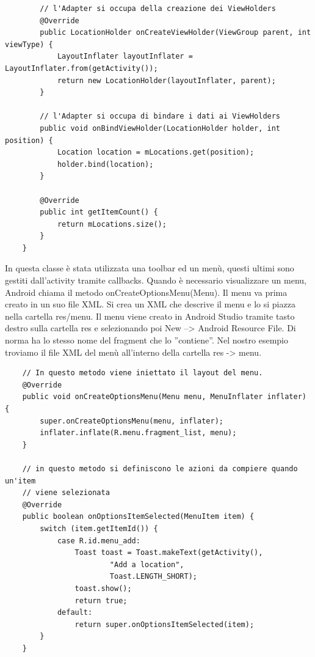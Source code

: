 \documentclass{article}
\begin{document}
\begin{itemize}
\begin{lstlisting}
        // l'Adapter si occupa della creazione dei ViewHolders
        @Override
        public LocationHolder onCreateViewHolder(ViewGroup parent, int viewType) {
            LayoutInflater layoutInflater = LayoutInflater.from(getActivity());
            return new LocationHolder(layoutInflater, parent);
        }

        // l'Adapter si occupa di bindare i dati ai ViewHolders
        public void onBindViewHolder(LocationHolder holder, int position) {
            Location location = mLocations.get(position);
            holder.bind(location);
        }

        @Override
        public int getItemCount() {
            return mLocations.size();
        }
    }
\end{lstlisting}
In questa classe è stata utilizzata una toolbar ed un menù, questi ultimi sono gestiti dall’activity tramite callbacks. Quando è
necessario visualizzare un menu, Android chiama il metodo onCreateOptionsMenu(Menu). Il menu va prima
creato in un suo file XML. Si crea un XML che descrive il menu e lo si piazza nella cartella res/menu. 
Il menu viene creato in Android Studio tramite tasto destro sulla cartella res e selezionando poi New –>
Android Resource File. Di norma ha lo stesso nome del fragment che lo ”contiene”. Nel nostro esempio troviamo il file
XML del menù all'interno della cartella res -> menu.
\begin{lstlisting}
    // In questo metodo viene iniettato il layout del menu.
    @Override
    public void onCreateOptionsMenu(Menu menu, MenuInflater inflater) {
        super.onCreateOptionsMenu(menu, inflater);
        inflater.inflate(R.menu.fragment_list, menu);
    }

    // in questo metodo si definiscono le azioni da compiere quando un'item
    // viene selezionata
    @Override
    public boolean onOptionsItemSelected(MenuItem item) {
        switch (item.getItemId()) {
            case R.id.menu_add:
                Toast toast = Toast.makeText(getActivity(),
                        "Add a location",
                        Toast.LENGTH_SHORT);
                toast.show();
                return true;
            default:
                return super.onOptionsItemSelected(item);
        }
    }
\end{lstlisting}
\end{itemize}
\end{document}
